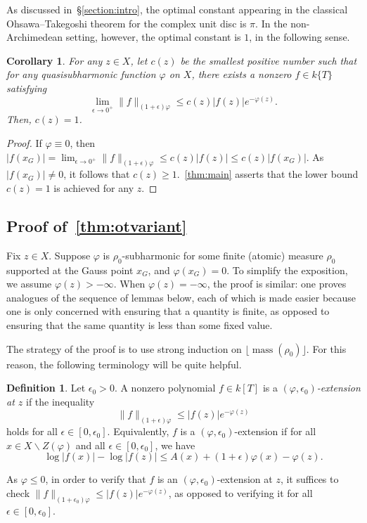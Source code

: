 \documentclass[10pt,reqno]{amsart}
\theoremstyle{plain}
\newtheorem{corollary}[theorem]{Corollary}
\theoremstyle{definition}
\newtheorem{definition}[theorem]{Definition}
\numberwithin{equation}{section}
\DeclareMathOperator{\mass}{mass}
\begin{document}
As discussed in~\S\ref{section:intro}, the optimal constant appearing in the classical Ohsawa--Takegoshi theorem for the complex unit disc is $\pi$. In the non-Archimedean setting, however, the optimal constant is $1$, in the following sense.

\begin{corollary}
For any $z \in X$, let $c(z)$ be the smallest positive number such that for any quasisubharmonic function $\varphi$ on $X$, there exists a nonzero $f \in k\{ T \}$ satisfying
$$
\lim_{\epsilon \to 0^+} \| f \|_{(1+\epsilon)\varphi } \leq c(z)|f(z)|e^{-\varphi(z)}.
$$
Then, $c(z) = 1$. 
\end{corollary}

\begin{proof}
If $\varphi \equiv 0$, then $|f(x_G)| = \lim_{\epsilon \to 0^+} \| f\|_{(1+\epsilon)\varphi } \leq c(z) |f(z)| \leq c(z) |f(x_G)|$. As $|f(x_G)| \not= 0$, it follows that $c(z) \geq 1$.~\cref{thm:main} asserts that the lower bound $c(z) = 1$ is achieved for any $z$.
\end{proof}

\subsection{Proof of~\texorpdfstring{\cref{thm:otvariant}}{Theorem \ref{thm:otvariant}}}\label{section:proof_variant} 


Fix $z \in X$.
Suppose $\varphi$ is $\rho_0$-subharmonic for some finite (atomic) measure $\rho_0$ supported at the Gauss point $x_G$, and $\varphi(x_G) = 0$. To simplify the exposition, we assume $\varphi(z) > -\infty$. When $\varphi(z) = -\infty$, the proof is similar: one proves analogues of the sequence of lemmas below, each of which is made easier because one is only concerned with ensuring that a quantity is finite, as opposed to ensuring that the same quantity is less than some fixed value. 

The strategy of the proof is to use strong induction on $\lfloor \mass(\rho_0) \rfloor$. For this reason, the following terminology will be quite helpful.

\begin{definition} 
Let $\epsilon_0 > 0$. A nonzero polynomial $f \in k[T]$ is a \emph{$(\varphi,\epsilon_0)$-extension at $z$} if the inequality 
$$\| f \|_{(1+\epsilon)\varphi } \leq |f(z)|e^{-\varphi(z)}$$
holds for all $\epsilon \in [0,\epsilon_0]$. Equivalently, $f$ is a $(\varphi,\epsilon_0)$-extension if for all $x \in X \backslash Z(\varphi)$ and all $\epsilon \in [0,\epsilon_0]$, we have
\begin{equation}
\label{extension inequality}
\log |f(x)| - \log |f(z)| \leq A(x) + (1+\epsilon)\varphi(x) - \varphi(z).
\end{equation}
\end{definition}
As $\varphi \leq 0$, in order to verify that $f$ is an $(\varphi,\epsilon_0)$-extension at $z$, it suffices to check $\| f \|_{(1+\epsilon_0)\varphi} \leq |f(z)|e^{-\varphi(z)}$, as opposed to verifying it for all $\epsilon \in [0,\epsilon_0]$.
\end{document}

